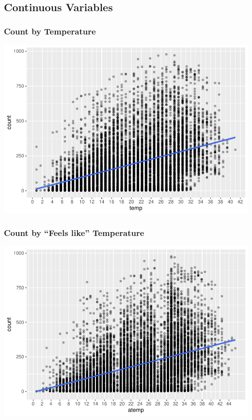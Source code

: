 \documentclass[american,]{article}
\begin{document}
\newpage

\hypertarget{continuous-variables}{%
\subsection{Continuous Variables}\label{continuous-variables}}

\hypertarget{count-by-temperature}{%
\subsubsection{Count by Temperature}\label{count-by-temperature}}

\includegraphics{BikeSharingDemand_files/figure-latex/train.mod.1.temp-1.pdf}

\newpage

\hypertarget{count-by-feels-like-temperature}{%
\subsubsection{Count by ``Feels like'' Temperature}\label{count-by-feels-like-temperature}}

\includegraphics{BikeSharingDemand_files/figure-latex/train.mod.1.atemp-1.pdf}
\end{document}
